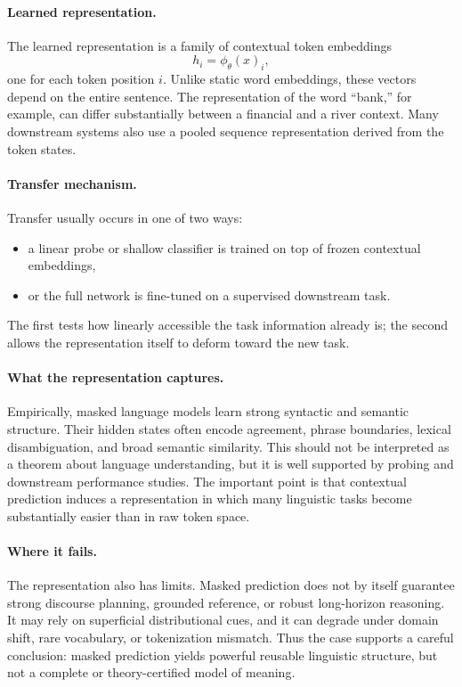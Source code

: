 \paragraph{Learned representation.}
The learned representation is a family of contextual token embeddings
\[
h_i = \phi_\theta(x)_i,
\]
one for each token position $i$.
Unlike static word embeddings, these vectors depend on the entire sentence.
The representation of the word ``bank,'' for example, can differ substantially between a financial and a river context.
Many downstream systems also use a pooled sequence representation derived from the token states.

\paragraph{Transfer mechanism.}
Transfer usually occurs in one of two ways:
\begin{itemize}
    \item a linear probe or shallow classifier is trained on top of frozen contextual embeddings,
    \item or the full network is fine-tuned on a supervised downstream task.
\end{itemize}
The first tests how linearly accessible the task information already is; the second allows the representation itself to deform toward the new task.

\paragraph{What the representation captures.}
Empirically, masked language models learn strong syntactic and semantic structure.
Their hidden states often encode agreement, phrase boundaries, lexical disambiguation, and broad semantic similarity.
This should not be interpreted as a theorem about language understanding, but it is well supported by probing and downstream performance studies.
The important point is that contextual prediction induces a representation in which many linguistic tasks become substantially easier than in raw token space.

\paragraph{Where it fails.}
The representation also has limits.
Masked prediction does not by itself guarantee strong discourse planning, grounded reference, or robust long-horizon reasoning.
It may rely on superficial distributional cues, and it can degrade under domain shift, rare vocabulary, or tokenization mismatch.
Thus the case supports a careful conclusion:
masked prediction yields powerful reusable linguistic structure, but not a complete or theory-certified model of meaning.

